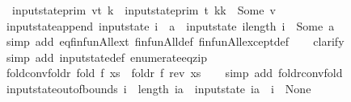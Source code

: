 \begin{isabellebody}
\ \ {\isachardoublequoteopen}input{}state{\isacharunderscore}prim\ {\isacharparenleft}v{\isacharhash}t{\isacharparenright}\ k\ {\isacharequal}\ {\isacharparenleft}input{}state{\isacharunderscore}prim\ t\ {\isacharparenleft}k{\isacharplus}{}{\isacharparenright}{\isacharparenright}{\isacharparenleft}k\ {\isachardollar}{\isacharcolon}{\isacharequal}\ Some\ v{\isacharparenright}{\isachardoublequoteclose}\isanewline
\isanewline
{}\isamarkupfalse%
\ input{}state{\isacharunderscore}append{\isacharcolon}\ {\isachardoublequoteopen}input{}state\ {\isacharparenleft}i\ {\isacharat}\ {\isacharbrackleft}a{\isacharbrackright}{\isacharparenright}\ {\isacharequal}\ {\isacharparenleft}input{}state\ i{\isacharparenright}{\isacharparenleft}length\ i\ {\isachardollar}{\isacharcolon}{\isacharequal}\ Some\ a{\isacharparenright}{\isachardoublequoteclose}\isanewline
%
\isadelimproof
\ \ %
\endisadelimproof
%
\isatagproof
{}\isamarkupfalse%
\ {\isacharparenleft}simp\ add{\isacharcolon}\ eq{\isacharunderscore}finfun{\isacharunderscore}All{\isacharunderscore}ext\ finfun{\isacharunderscore}All{\isacharunderscore}def\ finfun{\isacharunderscore}All{\isacharunderscore}except{\isacharunderscore}def{\isacharparenright}\isanewline
\ \ \isamarkupfalse%
\ clarify\isanewline
\ \ \isamarkupfalse%
\ {\isacharparenleft}simp\ add{\isacharcolon}\ input{}state{\isacharunderscore}def\ enumerate{\isacharunderscore}eq{\isacharunderscore}zip{\isacharparenright}%
\endisatagproof
{\isafoldproof}%
%
\isadelimproof
\isanewline
%
\endisadelimproof
\isanewline
{}\isamarkupfalse%
\ fold{\isacharunderscore}conv{\isacharunderscore}foldr{\isacharcolon}\ {\isachardoublequoteopen}fold\ f\ xs\ {\isacharequal}\ foldr\ f\ {\isacharparenleft}rev\ xs{\isacharparenright}{\isachardoublequoteclose}\isanewline
%
\isadelimproof
\ \ %
\endisadelimproof
%
\isatagproof
{}\isamarkupfalse%
\ {\isacharparenleft}simp\ add{\isacharcolon}\ foldr{\isacharunderscore}conv{\isacharunderscore}fold{\isacharparenright}%
\endisatagproof
{\isafoldproof}%
%
\isadelimproof
\isanewline
%
\endisadelimproof
\isanewline
{}\isamarkupfalse%
\ input{}state{\isacharunderscore}out{\isacharunderscore}of{\isacharunderscore}bounds{\isacharcolon}\ {\isachardoublequoteopen}i\ {\isasymge}\ length\ ia\ {\isasymLongrightarrow}\ input{}state\ ia\ {\isachardollar}\ i\ {\isacharequal}\ None{\isachardoublequoteclose}\isanewline
%
\isadelimproof
%
\endisadelimproof

\end{isabellebody}
